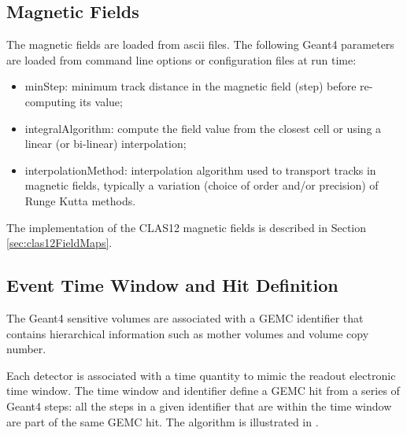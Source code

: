 \subsection{Magnetic Fields}
The magnetic fields are loaded from ascii files. The following Geant4 parameters are loaded from
command line options or configuration files at run time:

\begin{itemize}
	\item minStep: minimum track distance in the magnetic field (step) before re-computing its value;
	\item integralAlgorithm: compute the field value from the closest cell or using a linear (or bi-linear) interpolation;
	\item interpolationMethod: interpolation algorithm used to transport tracks in magnetic fields, typically
		  a variation (choice of order and/or precision) of Runge Kutta \cite{rungeKutta} methods.
\end{itemize}

The implementation of the CLAS12 magnetic fields is described in Section \ref{sec:clas12FieldMaps}.

\subsection{Event Time Window and Hit Definition}

The Geant4 sensitive volumes are associated with a GEMC identifier that contains hierarchical information such as mother volumes
and volume copy number.

Each detector is associated with a time quantity to mimic the readout electronic time window. The time window and identifier
define a GEMC hit from a series of Geant4 steps: all the steps in a given identifier that are within the time window
are part of the same GEMC hit. The algorithm is illustrated in .

